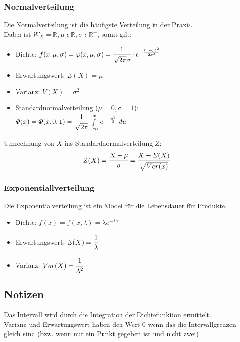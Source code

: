 \documentclass[a4paper]{scrartcl}
\begin{document}
            \subsubsection{Normalverteilung}
                Die Normalverteilung ist die häufigste Verteilung in der Praxis.\\
                Dabei ist  \(W_X = \mathbb{R}, \mu \; \epsilon \; \mathbb{R}, \sigma \; \epsilon \; \mathbb{R}^+ \), somit gilt: 
                \begin{itemize}
                    \item Dichte: \( f(x, \mu, \sigma)  = \varphi(x, \mu, \sigma) = \cfrac{1}{\sqrt{2\pi} \sigma} \cdot e^{- \frac{(x - \mu)^2}{2 \sigma^2}} \) 
                    \item Erwartungswert: \(E(X) = \mu\)
                    \item Varianz: \(V(X) = \sigma^2\)
                    \item Standardnormalverteilung (\(\mu = 0, \sigma = 1\)):  \(\varPhi(x) = \varPhi(x,0,1) = \cfrac{1}{\sqrt{2\pi}} \int\limits_{-\infty}^xe^{\ - \frac{u^2}{2}} \; du\)
                \end{itemize}
                Umrechnung von \(X\) ins Standardnormalverteilung \(Z\): 
                \begin{equation*}
                    Z(X) = \cfrac{X - \mu}{\sigma}  = \cfrac{X - E(X)}{\sqrt{Var(x)}} 
                \end{equation*}
            \subsubsection{Exponentiallverteilung}
                Die Exponentialverteilung ist ein Model für die Lebensdauer für Produkte.
                \begin{itemize}
                    \item Dichte: \(f(x) = f(x, \lambda) = \lambda e^{-\lambda x}\) 
                    \item Erwartungswert: \(E(X) = \cfrac{1}{\lambda} \)
                    \item Varianz: \(Var(X) =  \cfrac{1}{\lambda^2} \)
                \end{itemize}
            \subsection{Notizen}
                Das Intervall wird durch die Integration der Dichtefunktion ermittelt. \\
                Varianz und Erwartungswert haben den Wert 0 wenn das die Intervallgrenzen gleich sind (bzw. wenn nur ein Punkt gegeben ist und nicht zwei)
\end{document}
